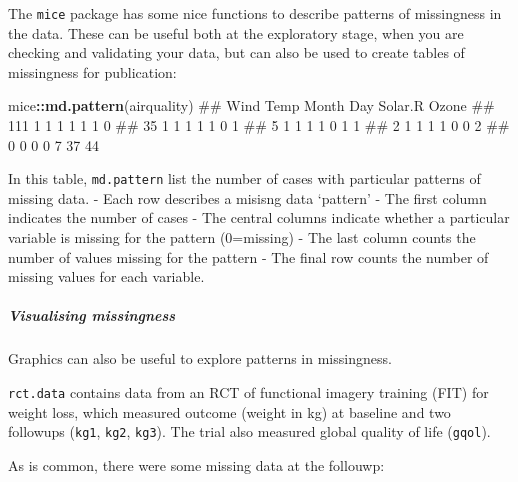 \documentclass[]{article}
\newenvironment{Shaded}{\begin{snugshade}}{\end{snugshade}}
\newcommand{\KeywordTok}[1]{\textcolor[rgb]{0.13,0.29,0.53}{\textbf{#1}}}
\newcommand{\StringTok}[1]{\textcolor[rgb]{0.31,0.60,0.02}{#1}}
\newcommand{\OperatorTok}[1]{\textcolor[rgb]{0.81,0.36,0.00}{\textbf{#1}}}
\newcommand{\NormalTok}[1]{#1}
\let\oldsubparagraph\subparagraph
\renewcommand{\subparagraph}[1]{\oldsubparagraph{#1}\mbox{}}
\theoremstyle{definition}
\theoremstyle{definition}
\theoremstyle{definition}
\theoremstyle{remark}
\begin{document}
The \texttt{mice} package has some nice functions to describe patterns
of missingness in the data. These can be useful both at the exploratory
stage, when you are checking and validating your data, but can also be
used to create tables of missingness for publication:

\begin{Shaded}
\begin{Highlighting}[]
\NormalTok{mice}\OperatorTok{::}\KeywordTok{md.pattern}\NormalTok{(airquality) }
\NormalTok{##     Wind Temp Month Day Solar.R Ozone   }
\NormalTok{## 111    1    1     1   1       1     1  0}
\NormalTok{##  35    1    1     1   1       1     0  1}
\NormalTok{##   5    1    1     1   1       0     1  1}
\NormalTok{##   2    1    1     1   1       0     0  2}
\NormalTok{##        0    0     0   0       7    37 44}
\end{Highlighting}
\end{Shaded}

In this table, \texttt{md.pattern} list the number of cases with
particular patterns of missing data. - Each row describes a misisng data
`pattern' - The first column indicates the number of cases - The central
columns indicate whether a particular variable is missing for the
pattern (0=missing) - The last column counts the number of values
missing for the pattern - The final row counts the number of missing
values for each variable.

\subparagraph{Visualising missingness}\label{visualising-missingness}

Graphics can also be useful to explore patterns in missingness.

\texttt{rct.data} contains data from an RCT of functional imagery
training (FIT) for weight loss, which measured outcome (weight in kg) at
baseline and two followups (\texttt{kg1}, \texttt{kg2}, \texttt{kg3}).
The trial also measured global quality of life (\texttt{gqol}).

As is common, there were some missing data at the follouwp:

\begin{Shaded}
\end{Shaded}
\end{document}
